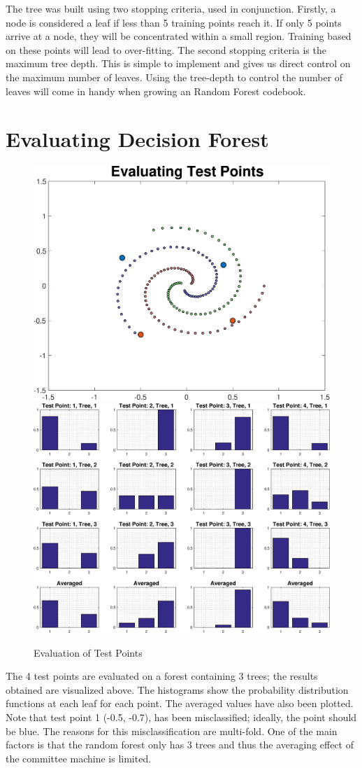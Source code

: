 \documentclass[a4paper,pra,twocolumn,10pt,aps,longbibliography,nobalancelastpage]{article}
\begin{document}
The tree was built using two stopping criteria, used in conjunction. Firstly, a node is considered a leaf if less than 5 training points reach it. If only 5 points arrive at a node, they will be concentrated within a small region. Training based on these points will lead to over-fitting. The second stopping criteria is the maximum tree depth. This is simple to implement and gives us direct control on the maximum number of leaves. Using the tree-depth to control the number of leaves will come in handy when growing an Random Forest codebook.

\section{Evaluating Decision Forest}\label{sec:eval}

\begin{figure}[H]
	\centering
    \includegraphics[width=0.49\columnwidth]{test_points_eval}
    \includegraphics[width=0.49\columnwidth]{test_points_hist}
    \caption{Evaluation of Test Points}
    \label{fig:leaf_nodes}
\end{figure}


The 4 test points are evaluated on a forest containing 3 trees; the results obtained are visualized above. The histograms show the probability distribution functions at each leaf for each point. The averaged values have also been plotted. Note that test point 1 (-0.5, -0.7), has been misclassified; ideally, the point should be blue. The reasons for this misclassification are multi-fold. One of the main factors is that the random forest only has 3 trees and thus the averaging effect of the committee machine is limited.
\end{document}
